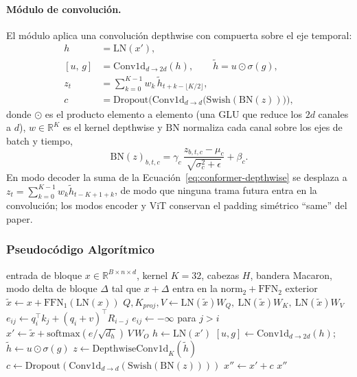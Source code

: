 \paragraph{Módulo de convolución.} El módulo aplica una convolución depthwise con compuerta sobre el eje temporal:
\begin{align}
h &= \mathrm{LN}(x'), \\
[u,\, g] &= \mathrm{Conv1d}_{d \to 2d}(h), \qquad
\tilde{h} = u \odot \sigma(g), \label{eq:conformer-glu}\\
z_t &= \sum_{k=0}^{K-1} w_k\, \tilde{h}_{t + k - \lfloor K/2 \rfloor}, \label{eq:conformer-depthwise}\\
c &= \mathrm{Dropout}\Big(\mathrm{Conv1d}_{d \to d}\big(\mathrm{Swish}(\mathrm{BN}(z))\big)\Big), \label{eq:conformer-conv-out}
\end{align}
donde $\odot$ es el producto elemento a elemento (una GLU que reduce los $2d$ canales a $d$), $w \in \mathbb{R}^{K}$ es el kernel depthwise y $\mathrm{BN}$ normaliza cada canal sobre los ejes de batch y tiempo,
\begin{equation}
\mathrm{BN}(z)_{b,t,c} = \gamma_c\,\frac{z_{b,t,c} - \mu_c}{\sqrt{\sigma_c^2 + \epsilon}} + \beta_c .
\label{eq:conformer-bn}
\end{equation}
En modo decoder la suma de la Ecuación~\ref{eq:conformer-depthwise} se desplaza a $z_t = \sum_{k=0}^{K-1} w_k \tilde{h}_{t-K+1+k}$, de modo que ninguna trama futura entra en la convolución; los modos encoder y ViT conservan el padding simétrico ``same'' del paper.

\subsubsection{Pseudocódigo Algorítmico}

\begin{algorithm}[H]
\caption{Bloque Conformer (\texttt{conformer})}
\begin{algorithmic}[1]
\Require entrada de bloque $x \in \mathbb{R}^{B \times n \times d}$, kernel $K=32$, cabezas $H$, bandera Macaron, modo
\Ensure delta de bloque $\Delta$ tal que $x + \Delta$ entra en la $\mathrm{norm}_2 + \mathrm{FFN}_2$ exterior
\State $\tilde{x} \gets x + \mathrm{FFN}_1(\mathrm{LN}(x))$ 
\State $Q, K_{proj}, V \gets \mathrm{LN}(\tilde{x})W_Q,\ \mathrm{LN}(\tilde{x})W_K,\ \mathrm{LN}(\tilde{x})W_V$
\State $e_{ij} \gets q_i^{\top}k_j + (q_i + v)^{\top}R_{i-j}$ 
    \State $e_{ij} \gets -\infty$ para $j > i$ 
\EndIf
\State $x' \gets \tilde{x} + \mathrm{softmax}(e/\sqrt{d_h})\,V\,W_O$
\State $h \gets \mathrm{LN}(x')$
\State $[u, g] \gets \mathrm{Conv1d}_{d \to 2d}(h)$; \quad $\tilde{h} \gets u \odot \sigma(g)$ 
\State $z \gets \mathrm{DepthwiseConv1d}_{K}(\tilde{h})$ 
\State $c \gets \mathrm{Dropout}(\mathrm{Conv1d}_{d \to d}(\mathrm{Swish}(\mathrm{BN}(z))))$
\State $x'' \gets x' + c$
\State \Return $x''$ 
\end{algorithmic}
\end{algorithm}

